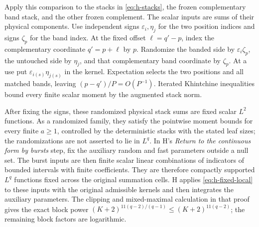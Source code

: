 Apply this comparison to the stacks in \eqref{eq:h-stacks},
the frozen complementary band stack, and the other frozen
complement.  The scalar inputs are sums of their physical
components.  Use independent signs \(\varepsilon_i,\eta_j\)
for the two position indices and signs \(\zeta_p\) for the
band index.  At the fixed offset \(\ell=q'-p\), index the complementary
coordinate \(q'=p+\ell\) by \(p\).  Randomize the banded side
by \(\varepsilon_i\zeta_p\), the untouched side by \(\eta_j\),
and that complementary band coordinate by \(\zeta_p\).  At a
use put \(\varepsilon_{i(s)}\eta_{j(s)}\) in the kernel.
Expectation selects the two positions and all matched bands,
leaving \((p-q')/P=O(P^{-1})\).  Iterated Khintchine
inequalities bound every finite scalar moment by the augmented
stack norm.

After fixing the signs, these randomized physical stack sums are
fixed scalar \(L^2\) functions.  As a randomized family, they satisfy
the pointwise moment bounds for every finite \(a\ge1\), controlled by
the deterministic stacks with the stated leaf sizes; the randomizations are not asserted to
lie in \(L^q\).  In H's \emph{Return to the continuous form by
bursts} step, fix the auxiliary random and fast parameters outside
a null set.  The burst inputs are then finite scalar linear
combinations of indicators of bounded intervals with finite
coefficients.  They are therefore compactly supported \(L^q\)
functions fixed across the original summation cells.  H applies
\eqref{eq:h-fixed-local} to these inputs with the original admissible
kernels and then integrates the auxiliary parameters.  The clipping
and mixed-maximal calculation in that proof gives the exact block
power \((K+2)^{11(q-2)/(q-1)}\le(K+2)^{11(q-2)}\); the remaining
block factors are logarithmic.

